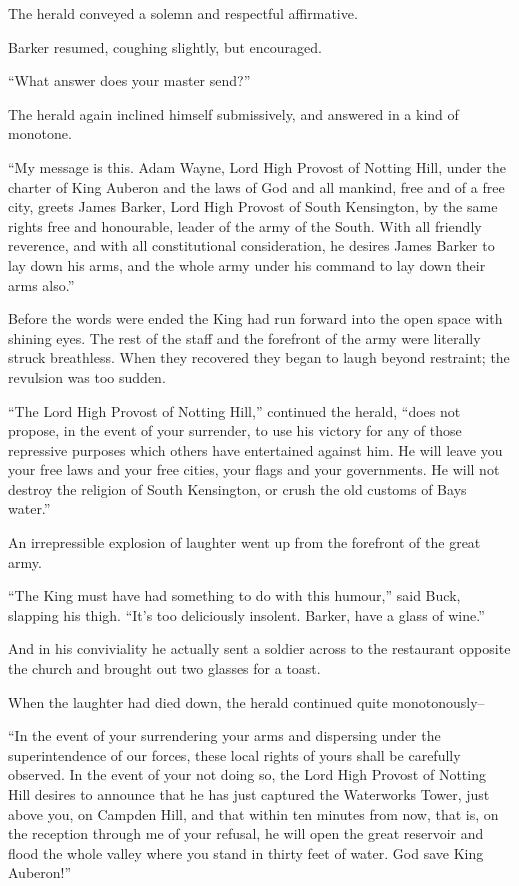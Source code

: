 \documentclass{book}
\begin{document}
The herald conveyed a solemn and respectful affirmative.

Barker resumed, coughing slightly, but encouraged.

“What answer does your master send?”

The herald again inclined himself submissively, and answered in a kind of monotone.

“My message is this. Adam Wayne, Lord High Provost of Notting Hill, under the charter of King Auberon and the laws of God and all mankind, free and of a free city, greets James Barker, Lord High Provost of South Kensington, by the same rights free and honourable, leader of the army of the South. With all friendly reverence, and with all constitutional consideration, he desires James Barker to lay down his arms, and the whole army under his command to lay down their arms also.”

Before the words were ended the King had run forward into the open space with shining eyes. The rest of the staff and the forefront of the army were literally struck breathless. When they recovered they began to laugh beyond restraint; the revulsion was too sudden.

“The Lord High Provost of Notting Hill,” continued the herald, “does not propose, in the event of your surrender, to use his victory for any of those repressive purposes which others have entertained against him. He will leave you your free laws and your free cities, your flags and your governments. He will not destroy the religion of South Kensington, or crush the old customs of Bays water.”

An irrepressible explosion of laughter went up from the forefront of the great army.

“The King must have had something to do with this humour,” said Buck, slapping his thigh. “It’s too deliciously insolent. Barker, have a glass of wine.”

And in his conviviality he actually sent a soldier across to the restaurant opposite the church and brought out two glasses for a toast.

When the laughter had died down, the herald continued quite monotonously–

“In the event of your surrendering your arms and dispersing under the superintendence of our forces, these local rights of yours shall be carefully observed. In the event of your not doing so, the Lord High Provost of Notting Hill desires to announce that he has just captured the Waterworks Tower, just above you, on Campden Hill, and that within ten minutes from now, that is, on the reception through me of your refusal, he will open the great reservoir and flood the whole valley where you stand in thirty feet of water. God save King Auberon!”
\end{document}
